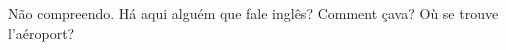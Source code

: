 \documentclass{article}
\begin{document}
 Não compreendo. Há aqui alguém que fale inglês?
 Comment çava? Où se trouve l'aéroport?
 
\end{document}
